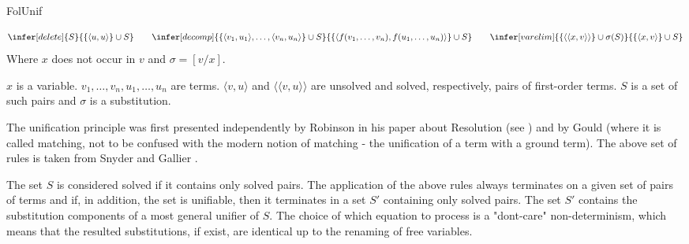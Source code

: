 \begin{entry}{FolUnif}

\newcommand{\upair}[2]{\langle#1, #2\rangle}
\newcommand{\spair}[2]{\langle\langle#1, #2\rangle\rangle}

\begin{calculus}
\[
\infer[delete] {S}
               {\{\upair u u\} \cup S}
\qquad
\infer[decomp] {\{\upair {v_1} {u_1} ,\ldots, \upair {v_n} {u_n}\}  \cup S}
               {\{\upair {f(v_1,\ldots,v_n)} {f(u_1,\ldots,u_n)}\} \cup S}
\qquad
\infer[varelim]{\{\spair x v\} \cup \sigma(S)}
               {\{\upair x v\} \cup S}
\]
Where $x$ does not occur in $v$ and $\sigma = [v/x]$.
\end{calculus}

\begin{clarifications}
  $x$ is a variable. $v_1,\ldots,v_n, u_1,\ldots, u_n$ are terms.
  $\upair v u$ and $\spair v u$ are unsolved and solved, respectively, pairs of first-order terms.
  $S$ is a set of such pairs and $\sigma$ is a substitution.
\end{clarifications}

\begin{history}
   The unification principle was first presented independently by Robinson
   in his paper about Resolution \cite{Robinson1965JACM} (see )
   and by Gould \cite{guard1964automated} (where it is called matching, not to
   be confused with the modern notion of matching - the unification of a term
   with a ground term).
   The above set of rules is taken from Snyder and Gallier \cite{Snyder1989101}.
\end{history}

\begin{technicalities}
   The set $S$ is considered
   solved if it contains only solved pairs. The application of the above rules always terminates on a given set of pairs of terms
   and if, in addition, the set is unifiable, then it terminates in a set $S'$ containing only solved pairs.
   The set $S'$ contains the substitution components \cite{Robinson1965JACM} of a most general unifier of $S$.
  The choice
 of which equation to process is a "dont-care" non-determinism, which means
that the resulted substitutions, if exist, are identical up to the renaming of free variables.
 \end{technicalities}


\end{entry}

